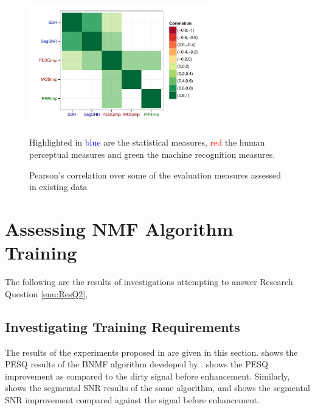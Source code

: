 \begin{figure}[h]
\noindent \begin{centering}
\includegraphics[width=0.7\textwidth]{fig/R/cor/litResCorr}
\par\end{centering}

Highlighted in \textcolor{blue}{blue} are the statistical measures,
\textcolor{red}{red} the human perceptual measures and \textcolor{dkgreen}{green}
the machine recognition measures.

\protect\caption{\label{fig:litResCorr}Pearson's correlation over some of the evaluation
measures assessed in existing data}
\end{figure}



\section{Assessing \acl{NMF} Algorithm Training}

The following are the results of investigations attempting to answer
Research Question \ref{enu:ResQ2}, \textit{\RQtwo{}}


\subsection{Investigating Training Requirements}

The results of the experiments proposed in 
are given in this section.  shows the \ac{PESQ}
results of the \ac{BNMF} algorithm developed by \citet{mohammadiha2013supervised}.
 shows the \ac{PESQ} improvement as
compared to the dirty signal before enhancement. Similarly, 
shows the segmental \ac{SNR} results of the same algorithm, and 
shows the segmental \ac{SNR} improvement compared against the signal
before enhancement.


